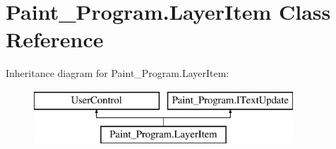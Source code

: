 \hypertarget{class_paint___program_1_1_layer_item}{}\section{Paint\+\_\+\+Program.\+Layer\+Item Class Reference}
\label{class_paint___program_1_1_layer_item}
Inheritance diagram for Paint\+\_\+\+Program.\+Layer\+Item\+:\begin{figure}[H]
\begin{center}
\leavevmode
\includegraphics[height=2.000000cm]{class_paint___program_1_1_layer_item}
\end{center}
\end{figure}
